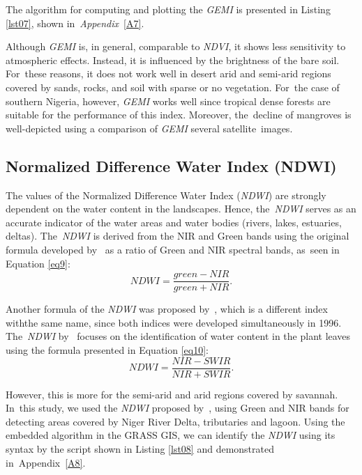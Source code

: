 \documentclass[jmse,article,accept,pdftex,moreauthors]{Definitions/mdpi}
\begin{document}
The algorithm for computing and plotting the \emph{GEMI} is presented in Listing \ref{lst07}, shown in~\emph{Appendix}~\ref{A7}.

Although \emph{GEMI} is, in general, comparable to \emph{NDVI}, it shows less sensitivity to atmospheric effects. Instead, it is influenced by the brightness of the bare soil. For~these reasons, it does not work well in desert arid and semi-arid regions covered by sands, rocks, and soil with sparse or no vegetation. For~the case of southern Nigeria, however, \emph{GEMI} works well since tropical dense forests are suitable for the performance of this index. Moreover, the~decline of mangroves is well-depicted using a comparison of \emph{GEMI} several satellite~images.

\subsection{Normalized Difference Water Index (NDWI)}

The values of the Normalized Difference Water Index (\emph{NDWI}) are strongly dependent on the water content in the landscapes. Hence, the~\emph{NDWI} serves as an accurate indicator of the water areas and water bodies (rivers, lakes, estuaries, deltas). The~\emph{NDWI} is derived from the NIR and Green bands using the original formula developed by~\cite{McFeeters} as a ratio of Green and NIR spectral bands, as~seen in Equation \eqref{eq9}:
\begin{equation}\label{eq9}
	NDWI = \frac{green - NIR}{green + NIR}.
\end{equation} 

Another formula of the \emph{NDWI} was proposed by~\cite{GAO1996257}, which is a different index withthe same name, since both indices were developed simultaneously in 1996. The~\emph{NDWI} by~\cite{GAO1996257} focuses on the identification of water content in the plant leaves using the formula presented in Equation \eqref{eq10}:
\begin{equation}\label{eq10}
	NDWI = \frac{NIR - SWIR}{NIR + SWIR}.
\end{equation} 

However, this is more for the semi-arid and arid regions covered by savannah. In~this study, we used the \emph{NDWI} proposed by~\cite{McFeeters}, using Green and NIR bands for detecting areas covered by Niger River Delta, tributaries and lagoon.  Using the embedded algorithm in the GRASS GIS, we can identify the \emph{NDWI} using its syntax by the script shown in Listing \ref{lst08} and demonstrated in~Appendix~\ref{A8}.
\end{document}
